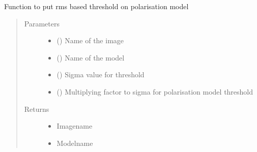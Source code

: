 \documentclass[letterpaper,10pt,english]{sphinxmanual}
\begin{document}
\begin{fulllineitems}
\begin{fulllineitems}
\label{\detokenize{paircars:paircars.fullpol_selfcal_LTS.PolSelfcal.pol_model_threshold}}
\sphinxAtStartPar
Function to put rms based threshold on polarisation model
\begin{quote}\begin{description}
\item[{Parameters}] \leavevmode\begin{itemize}
\item {} 
\sphinxAtStartPar
{} () \textendash{} Name of the image

\item {} 
\sphinxAtStartPar
{} () \textendash{} Name of the model

\item {} 
\sphinxAtStartPar
{} () \textendash{} Sigma value for threshold

\item {} 
\sphinxAtStartPar
{} () \textendash{} Multiplying factor to sigma for polarisation model threshold

\end{itemize}

\item[{Returns}] \leavevmode
\sphinxAtStartPar
\begin{itemize}
\item {} 
\sphinxAtStartPar
{} \textendash{} Imagename

\item {} 
\sphinxAtStartPar
{} \textendash{} Modelname

\end{itemize}


\end{description}\end{quote}

\end{fulllineitems}


\end{fulllineitems}
\end{document}

